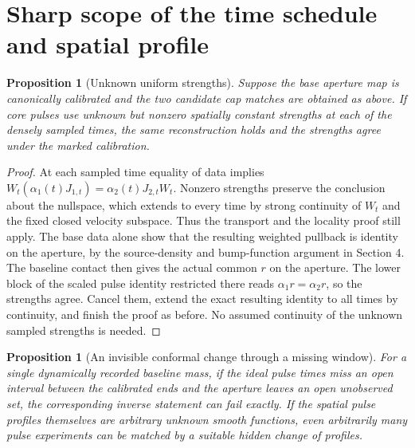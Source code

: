 \documentclass[11pt]{article}
\numberwithin{equation}{section}
\newtheorem{proposition}[theorem]{Proposition}
\begin{document}
\section{Sharp scope of the time schedule and spatial profile}

\begin{proposition}[Unknown uniform strengths]\label{prop:gain}
Suppose the base aperture map is canonically calibrated and the two candidate cap matches are obtained as above. If core pulses use unknown but nonzero spatially constant strengths at each of the densely sampled times, the same reconstruction holds and the strengths agree under the marked calibration.
\end{proposition}

\begin{proof}
At each sampled time equality of data implies
\(W_t(\alpha_1(t)J_{1,t})=\alpha_2(t)J_{2,t}W_t\).
Nonzero strengths preserve the conclusion about the nullspace, which extends to every time by strong continuity of \(W_t\) and the fixed closed velocity subspace. Thus the transport and the locality proof still apply. The base data alone show that the resulting weighted pullback is identity on the aperture, by the source-density and bump-function argument in Section 4. The baseline contact then gives the actual common \(r\) on the aperture. The lower block of the scaled pulse identity restricted there reads \(\alpha_1 r=\alpha_2 r\), so the strengths agree. Cancel them, extend the exact resulting identity to all times by continuity, and finish the proof as before. No assumed continuity of the unknown sampled strengths is needed.
\end{proof}

\begin{proposition}[An invisible conformal change through a missing window]\label{prop:blind}
For a single dynamically recorded baseline mass, if the ideal pulse times miss an open interval between the calibrated ends and the aperture leaves an open unobserved set, the corresponding inverse statement can fail exactly. If the spatial pulse profiles themselves are arbitrary unknown smooth functions, even arbitrarily many pulse experiments can be matched by a suitable hidden change of profiles.
\end{proposition}
\end{document}
